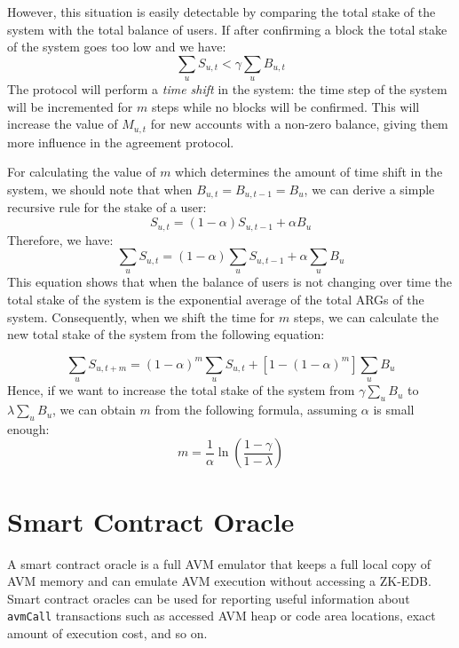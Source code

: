 \documentclass[a4paper]{report}
\begin{document}
    However, this situation is easily detectable by comparing the total stake of the system with the total balance of
    users. If after confirming a block the total stake of the system goes too low and we have:
    \[
        \sum_{u}S_{u,t} < \gamma \sum_{u}B_{u,t}
    \]
    The protocol will perform a \emph{time shift} in the system: the time step of the system
    will be incremented for \(m\) steps while no blocks will be confirmed. This will increase the value of \(M_{u,t}\)
    for new accounts with a non-zero balance, giving them more influence in the agreement protocol.

    For calculating the value of \(m\) which determines the amount of time shift in the system, we should note that when
    \(B_{u,t} = B_{u, t-1} = B_u\), we can derive a simple recursive rule for the stake of a user:
    \[
        S_{u,t} = (1 - \alpha) S_{u,t-1} + \alpha B_u
    \]
    Therefore, we have:
    \[
        \sum_{u}S_{u,t} = (1 - \alpha) \sum_{u}S_{u,t - 1} + \alpha \sum_{u}B_u
    \]
    This equation shows that when the balance of users is not changing over time the total stake of the system is the
    exponential average of the total ARGs of the system. Consequently, when we shift the time for \(m\) steps, we can
    calculate the new total stake of the system from the following equation:

    \[
        \sum_{u}S_{u,t+m} = (1 - \alpha)^{m}\sum_{u}S_{u,t} + [1 - (1 - \alpha)^{m}]\sum_{u}B_u
    \]
    Hence, if we want to increase the total stake of the system from \(\gamma \sum_{u}B_u\) to \(\lambda \sum_{u}B_u\),
    we can obtain \(m\) from the following formula, assuming \(\alpha\) is small enough:
    \[
        m = \frac{1}{\alpha} \ln \left(\frac{1 - \gamma}{1 - \lambda}\right)
    \]


    \section{Smart Contract Oracle}\label{sec:smart-contract-oracle}

    A smart contract oracle is a full AVM emulator that keeps a full local copy of AVM memory and can emulate AVM
    execution without accessing a ZK-EDB. Smart contract oracles can be used for reporting useful information about
    \texttt{avmCall} transactions such as accessed AVM heap or code area locations, exact amount of execution cost,
    and so on.
\end{document}
